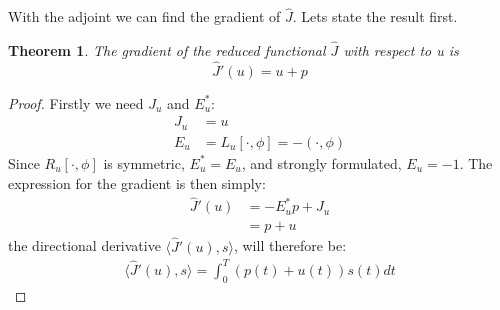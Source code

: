 \documentclass[11pt,a4paper]{article}
\newtheorem{theorem}{Theorem}
\begin{document}
With the adjoint we can find the gradient of $\hat{J}$. Lets state the result first.
\begin{theorem}
The gradient of the reduced functional $\hat{J}$ with respect to u is 
$$\hat{J}'(u)=u+p$$
\end{theorem}
\begin{proof}
Firstly we need $J_u$ and $E_u^*$:
\begin{align*}
J_u &= u \\
E_u &= L_u[\cdot,\phi] = -(\cdot,\phi)
\end{align*}
Since $R_u[\cdot,\phi]$ is symmetric, $E_u^*=E_u$, and strongly formulated, $E_u=-1$. The expression for the gradient is then simply:
\begin{align*}
\hat{J}'(u)&=-E_u^*p + J_u \\
&= p+u
\end{align*} 
the directional derivative $\langle\hat{J}'(u),s\rangle$, will therefore be:
\begin{align*}
\langle\hat{J}'(u),s\rangle =\int_0^T(p(t)+u(t))s(t)dt
\end{align*}
\end{proof}
\end{document}
